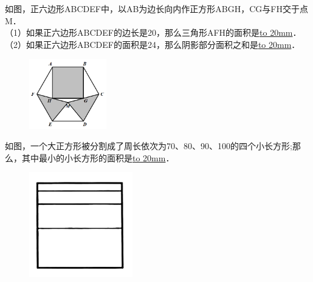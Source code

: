 \item {
    如图，正六边形ABCDEF中，以AB为边长向内作正方形ABGH，CG与FH交于点M．\\
    （1）如果正六边形ABCDEF的边长是20，那么三角形AFH的面积是\underline{\hbox to 20mm{}}．\\
    （2）如果正六边形ABCDEF的面积是24，那么阴影部分面积之和是\underline{\hbox to 20mm{}}．
    \begin{figure}[H] 
        \centering
        \includegraphics[width=0.3\textwidth]{./pics/Chapter_3/3.png}
    \end{figure}
    \vspace{1cm}
}
\item {
    如图，一个大正方形被分割成了周长依次为70、80、90、100的四个小长方形;那么，其中最小的小长方形的面积是\underline{\hbox to 20mm{}}．
    \begin{figure}[H] 
        \centering
        \includegraphics[width=0.4\textwidth]{./pics/Chapter_3/4.png}
    \end{figure}
    \vspace{1cm}
}

